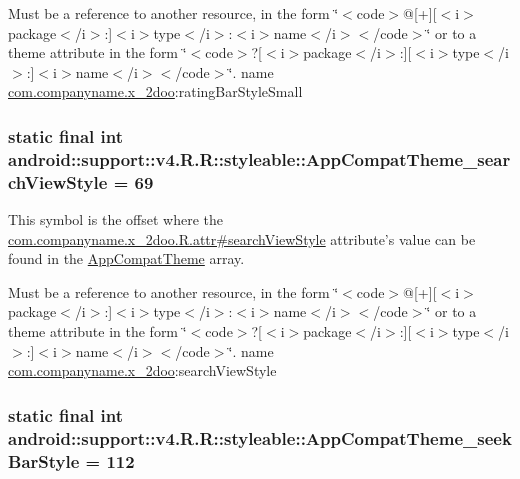 Must be a reference to another resource, in the form \char`\"{}$<$code$>$@\mbox{[}+\mbox{]}\mbox{[}$<$i$>$package$<$/i$>$:\mbox{]}$<$i$>$type$<$/i$>$:$<$i$>$name$<$/i$>$$<$/code$>$\char`\"{} or to a theme attribute in the form \char`\"{}$<$code$>$?\mbox{[}$<$i$>$package$<$/i$>$:\mbox{]}\mbox{[}$<$i$>$type$<$/i$>$:\mbox{]}$<$i$>$name$<$/i$>$$<$/code$>$\char`\"{}.  name \hyperlink{namespacecom_1_1companyname_1_1x__2doo}{com.companyname.x\_\-2doo}:ratingBarStyleSmall \hypertarget{classandroid_1_1support_1_1v4_1_1_r_1_1styleable_4c487a848b41d29bf3dc21719d968cd6}{
\subsubsection[{AppCompatTheme\_\-searchViewStyle}]{\setlength{\rightskip}{0pt plus 5cm}static final int android::support::v4.R.R::styleable::AppCompatTheme\_\-searchViewStyle = 69}}
\label{classandroid_1_1support_1_1v4_1_1_r_1_1styleable_4c487a848b41d29bf3dc21719d968cd6}


This symbol is the offset where the \hyperlink{classcom_1_1companyname_1_1x__2doo_1_1_r_1_1attr_a153e0e7d598f58190e06e96df6401e7}{com.companyname.x\_\-2doo.R.attr\#searchViewStyle} attribute's value can be found in the \hyperlink{classandroid_1_1support_1_1v4_1_1_r_1_1styleable_0873e92ba21076bb5a4aeadeb7f5779f}{AppCompatTheme} array.

Must be a reference to another resource, in the form \char`\"{}$<$code$>$@\mbox{[}+\mbox{]}\mbox{[}$<$i$>$package$<$/i$>$:\mbox{]}$<$i$>$type$<$/i$>$:$<$i$>$name$<$/i$>$$<$/code$>$\char`\"{} or to a theme attribute in the form \char`\"{}$<$code$>$?\mbox{[}$<$i$>$package$<$/i$>$:\mbox{]}\mbox{[}$<$i$>$type$<$/i$>$:\mbox{]}$<$i$>$name$<$/i$>$$<$/code$>$\char`\"{}.  name \hyperlink{namespacecom_1_1companyname_1_1x__2doo}{com.companyname.x\_\-2doo}:searchViewStyle \hypertarget{classandroid_1_1support_1_1v4_1_1_r_1_1styleable_feb452e918c5ee9d2dc74ac8a5370e9d}{
\subsubsection[{AppCompatTheme\_\-seekBarStyle}]{\setlength{\rightskip}{0pt plus 5cm}static final int android::support::v4.R.R::styleable::AppCompatTheme\_\-seekBarStyle = 112}}
\label{classandroid_1_1support_1_1v4_1_1_r_1_1styleable_feb452e918c5ee9d2dc74ac8a5370e9d}


